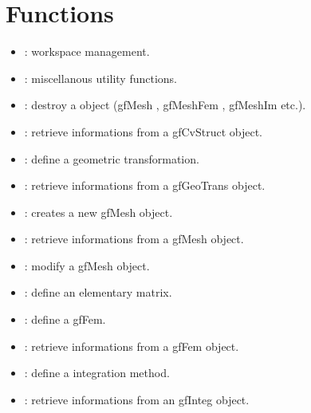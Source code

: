 \documentclass[a4paper,11pt,english]{sphinxmanual}
\begin{document}
\section{Functions}
\label{\detokenize{matlab_octave/mlabgf:functions}}\begin{itemize}
\item {} 
 : workspace management.

\item {} 
 : miscellanous utility functions.

\item {} 
 : destroy a  object (gfMesh , gfMeshFem , gfMeshIm etc.).

\item {} 
 : retrieve informations from a gfCvStruct object.

\item {} 
 : define a geometric transformation.

\item {} 
 : retrieve informations from a gfGeoTrans object.

\item {} 
 : creates a new gfMesh object.

\item {} 
 : retrieve informations from a gfMesh object.

\item {} 
 : modify a gfMesh object.

\item {} 
 : define an elementary matrix.

\item {} 
 : define a gfFem.

\item {} 
 : retrieve informations from a gfFem object.

\item {} 
 : define a integration method.

\item {} 
 : retrieve informations from an gfInteg object.


\end{itemize}
\end{document}
